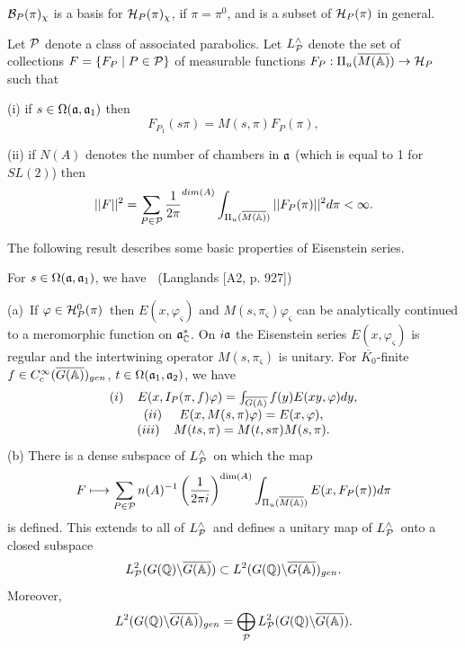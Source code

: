 ${\cal B}_P(\pi)_\chi$ is a basis for
${\cal H}_P(\pi)_\chi$, if $\pi=\pi^0$, and is a subset of
${\cal H}_P(\pi)$ in general.

Let ${\cal P}$ denote a class of associated parabolics. Let
$L_{{\cal P}}^{\wedge }$ denote the
set of collections $F=\{F_P\;|\;P\in {\cal P}\}$ of
measurable functions
$F_P:\Pi _u(\overline{M({\Bbb{A}})})\rightarrow {\cal H}_P$ such
that

(i) if $s\in \Omega ({\frak{a}},{\frak{a}}_1)$ then 
\[
F_{P_1}(s\pi )=M(s,\pi )F_P(\pi ),
\]

(ii) if $N(A)$ denotes the number of chambers in ${\frak{a}}$
(which is equal to 1 for $SL(2)$) then 
\[
||F||^2=\sum_{P\in {\cal{P}}}{1\over 2\pi }^{dim(A)}
\int_{\Pi _u(\overline{M({\Bbb{A}})})}
||F_P(\pi )||^2d\pi <\infty .
\]

The following result describes some basic properties of Eisenstein series.

\begin{theorem} For
$s\in \Omega ({\frak{a}},{\frak{a}}_1)$, we have
{\bf \ }(Langlands [A2, p. 927])

(a)\ If $\varphi \in {\cal H}_P^0(\pi )$\ then
$E(x,\varphi _\varsigma )$ and
$M(s,\pi _\varsigma )\varphi _\varsigma $
can be analytically continued
to a meromorphic function on ${\frak{a}}_{{\Bbb C}}^{*}$. On 
$i{\frak{a}}$ the
Eisenstein series $E(x,\varphi_\varsigma )$
is regular and the intertwining operator $M(s,\pi_\varsigma )$
is unitary. For $\overline{K_0}$-finite
$f\in C_c^\infty (\overline{G({\Bbb{A}})})_{gen}$,
$t\in \Omega ({\frak{a}}_1,{\frak{a}}_2)$, we have 
\[
\begin{array}{c}
(i)\;\;\;\;E(x,I_P(\pi ,f)\varphi )
=\int_{\overline{G({\Bbb{A}})}}f(y)E(xy,\varphi )dy,
\\ 
(ii)\;\;\;\;\;E(x,M(s,\pi )\varphi )=E(x,\varphi ), \\ 
(iii)\;\;\;\;M(ts,\pi )=M(t,s\pi )M(s,\pi ).
\end{array}
\]
(b) There is a dense subspace of $L_{{\cal P}}^{\wedge }$\ on which the map 
\[
F\longmapsto \sum_{P\in {\cal P}}n(A)^{-1}
\left( \frac 1{2\pi i}\right)^{\dim (A)}
\int_{\Pi _u(\overline{M({\Bbb{A}})})}E(x,F_P(\pi ))d\pi 
\]
is defined. This extends to all of $L_{{\cal P}}^{\wedge }$\ and defines a
unitary map of $L_{{\cal P}}^{\wedge }$\ onto a closed subspace 
\[
L_{{\cal P}}^2(G({{\Bbb{Q}}})\backslash \overline{G({\Bbb{A}})})
\subset L^2(G({\Bbb{Q}})\backslash \overline{G({\Bbb{A}})})_{gen}.
\]
Moreover, 
\[
L^2(G({\Bbb{Q}})\backslash \overline{G({\Bbb{A}})})_{gen}
=\bigoplus_{\cal{P}}
L_{\cal{P}}^2(G({\Bbb{Q}})\backslash \overline{G({\Bbb{A}})}).
\]
\end{theorem}


